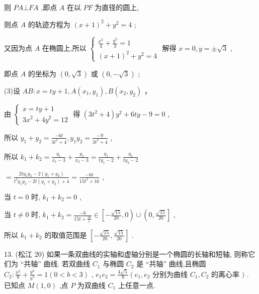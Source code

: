 \documentclass[10pt]{article}
\begin{document}
则 \({PA} \bot  {FA}\) ,即点 \(A\) 在以 \({PF}\) 为直径的圆上,

则点 \(A\) 的轨迹方程为 \({\left( x + 1\right) }^{2} + {y}^{2} = 4\) ;

又因为点 \(A\) 在椭圆上,所以 \(\left\{  \begin{array}{l} \frac{{x}^{2}}{4} + \frac{{y}^{2}}{3} = 1 \\  {\left( x + 1\right) }^{2} + {y}^{2} = 4 \end{array}\right.\) 解得 \(x = 0,y =  \pm  \sqrt{3}\) ,

即点 \(A\) 的坐标为 \(\left( {0,\sqrt{3}}\right)\) 或 \(\left( {0, - \sqrt{3}}\right)\) ;

(3)设 \({AB} : x = {ty} + 1,A\left( {{x}_{1},{y}_{1}}\right) ,B\left( {{x}_{2},{y}_{2}}\right)\) ，

由 \(\left\{  \begin{matrix} x = {ty} + 1 \\  3{x}^{2} + 4{y}^{2} = {12} \end{matrix}\right.\) 得 \(\left( {3{t}^{2} + 4}\right) {y}^{2} + {6ty} - 9 = 0\) ,

所以 \({y}_{1} + {y}_{2} = \frac{-{6t}}{3{t}^{2} + 4},{y}_{1}{y}_{2} = \frac{-9}{3{t}^{2} + 4}\) ,

所以 \({k}_{1} + {k}_{2} = \frac{{y}_{1}}{{x}_{1} - 3} + \frac{{y}_{2}}{{x}_{2} - 3} = \frac{{y}_{1}}{t{y}_{1} - 2} + \frac{{y}_{2}}{t{y}_{2} - 2}\)

\(= \frac{{2t}{y}_{1}{y}_{2} - 2\left( {{y}_{1} + {y}_{2}}\right) }{{t}^{2}{y}_{1}{y}_{2} - {2t}\left( {{y}_{1} + {y}_{2}}\right)  + 4} = \frac{-{6t}}{{15}{t}^{2} + {16}}\) ,

当 \(t = 0\) 时, \({k}_{1} + {k}_{2} = 0\) ,

当 \(t \neq  0\) 时, \({k}_{1} + {k}_{2} = \frac{-6}{{15t} + \frac{16}{t}} \in  \left\lbrack  {-\frac{\sqrt{15}}{20},0}\right)  \cup  \left( {0,\frac{\sqrt{15}}{20}}\right\rbrack\) ,

所以 \({k}_{1} + {k}_{2}\) 的取值范围是 \(\left\lbrack  {-\frac{\sqrt{15}}{20},\frac{\sqrt{15}}{20}}\right\rbrack\) .

13. (松江 20) 如果一条双曲线的实轴和虚轴分别是一个椭圆的长轴和短轴, 则称它们为 “共轴” 曲线. 若双曲线 \({C}_{1}\) 与椭圆 \({C}_{2}\) 是 “共轴” 曲线,且椭圆 \({C}_{2} : \frac{{x}^{2}}{9} + \frac{{y}^{2}}{{b}^{2}} = 1\left( {0 < b < 3}\right)\) , \({e}_{1}{e}_{2} = \frac{4\sqrt{5}}{9}\left( {{e}_{1},{e}_{2}}\right.\) 分别为曲线 \({C}_{1},{C}_{2}\) 的离心率 \()\) . 已知点 \(M\left( {1,0}\right)\) ,点 \(P\) 为双曲线 \({C}_{1}\) 上任意一点.
\end{document}
